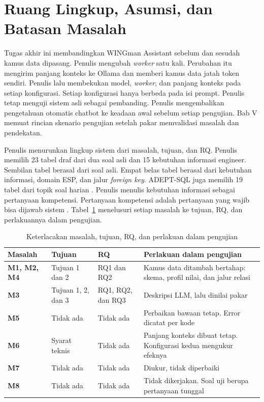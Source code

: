 \section{Ruang Lingkup, Asumsi, dan Batasan Masalah}
Tugas akhir ini membandingkan WINGman Assistant sebelum dan sesudah kamus data dipasang. Penulis mengubah \emph{worker} satu kali. Perubahan itu mengirim panjang konteks ke Ollama dan memberi kamus data jatah token sendiri. Penulis lalu membekukan model, \emph{worker}, dan panjang konteks pada setiap konfigurasi. Setiap konfigurasi hanya berbeda pada isi prompt. Penulis tetap menguji sistem asli sebagai pembanding. Penulis mengembalikan pengetahuan otomatis chatbot ke keadaan awal sebelum setiap pengujian. Bab V memuat rincian skenario pengujian setelah pakar memvalidasi masalah dan pendekatan.

Penulis menurunkan lingkup sistem dari masalah, tujuan, dan RQ. Penulis memilih 23 tabel draf dari dua soal asli dan 15 kebutuhan informasi engineer. Sembilan tabel berasal dari soal asli. Empat belas tabel berasal dari kebutuhan informasi, domain ESP, dan jalur \emph{foreign key}. ADEPT-SQL juga memilih 19 tabel dari topik soal harian \autocite{chen2025adeptsql}. Penulis menulis kebutuhan informasi sebagai pertanyaan kompetensi. Pertanyaan kompetensi adalah pertanyaan yang wajib bisa dijawab sistem \autocite{ren2014competencyquestions}. Tabel~\ref{tab:keterlacakan} menelusuri setiap masalah ke tujuan, RQ, dan perlakuannya dalam pengujian.

\begin{table}[!htbp]
  \caption{Keterlacakan masalah, tujuan, RQ, dan perlakuan dalam pengujian}
  \label{tab:keterlacakan}
  \footnotesize
  \begin{tabularx}{\textwidth}{|>{\raggedright\arraybackslash}p{2.0cm}|>{\raggedright\arraybackslash}p{2.4cm}|>{\raggedright\arraybackslash}p{2.4cm}|>{\raggedright\arraybackslash}X|}
    \hline
    \textbf{Masalah} & \textbf{Tujuan} & \textbf{RQ} & \textbf{Perlakuan dalam pengujian} \\
    \hline
    \textbf{M1, M2, M4} & Tujuan 1 dan 2 & RQ1 dan RQ2 & Kamus data ditambah bertahap: skema, profil nilai, dan jalur relasi \\
    \hline
    \textbf{M3} & Tujuan 1, 2, dan 3 & RQ1, RQ2, dan RQ3 & Deskripsi LLM, lalu dinilai pakar \\
    \hline
    \textbf{M5} & Tidak ada & Tidak ada & Perbaikan bawaan tetap. Error dicatat per kode \\
    \hline
    \textbf{M6} & Syarat teknis & Tidak ada & Panjang konteks dibuat tetap. Konfigurasi kedua mengukur efeknya \\
    \hline
    \textbf{M7} & Tidak ada & Tidak ada & Diukur, tidak diperbaiki \\
    \hline
    \textbf{M8} & Tidak ada & Tidak ada & Tidak dikerjakan. Soal uji berupa pertanyaan tunggal \\
    \hline
  \end{tabularx}
\end{table}


